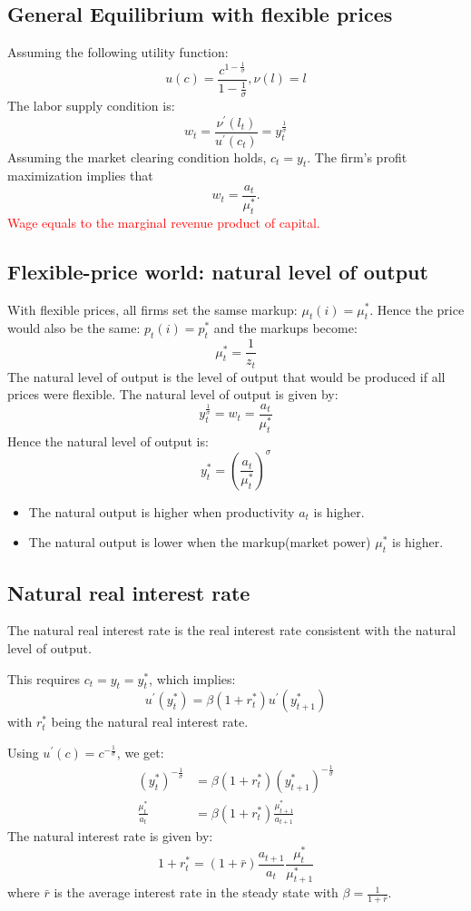 \subsection{General Equilibrium with flexible prices}

Assuming the following utility function:
\[
u(c) = \frac{c^{1-\frac{1}{\sigma}}}{1-\frac{1}{\sigma}}, \nu(l) = l
\]
The labor supply condition is:
\[
w_t = \frac{\nu^{\prime}(l_t)}{u^{\prime}(c_t)} = y_t^{\frac{1}{\sigma}}
\]
Assuming the market clearing condition holds, $c_t = y_t$.
The firm's profit maximization implies that 
\[
w_t = \frac{a_t}{\mu_t^*}.
\]
\textcolor{red}{Wage equals to the marginal revenue product of capital.}

\subsection{Flexible-price world: natural level of output}
With flexible prices, all firms set the samse markup: $\mu_t(i) = \mu_t^*$.
Hence the price would also be the same: $p_t(i) = p_t^*$ and the markups
become:
\[
\mu_t^* = \frac{1}{z_t}
\]
The natural level of output is the level of output that would be produced if all prices were flexible.
The natural level of output is given by:
\[
y_t^{\frac{1}{\sigma}} = w_t = \frac{a_t}{\mu_t^*}
\]
Hence the natural level of output is:
\[
y_t^* = \left( \frac{a_t}{\mu_t^*} \right)^{\sigma}
\]
\begin{itemize}
    \item The natural output is higher when productivity $a_t$ is higher.
    \item The natural output is lower when the markup(market power) $\mu_t^*$ is higher.
\end{itemize}

\subsection{Natural real interest rate}
The natural real interest rate is the real interest rate consistent with the natural level of output.

This requires $c_t = y_t = y_t^*$, which implies:
\[
u^{\prime} (y_t^*) = \beta (1+r_t^*)u^{\prime} (y_{t+1}^*)
\]
with $r_t^*$ being the natural real interest rate.

Using $u^{\prime}(c) = c^{-\frac{1}{\sigma}}$, we get:
\begin{align*}
    \left(y_t^{*}\right)^{-\frac{1}{\sigma}} &= \beta (1+r_t^*)\left(y_{t+1}^*\right)^{-\frac{1}{\sigma}}\\
    \frac{\mu_t^*}{a_t} &= \beta (1+r_t^*)\frac{\mu_{t+1}^*}{a_{t+1}}
\end{align*}
The natural interest rate is given by:
\[
1 + r_t^* = (1+\bar{r}) \frac{a_{t+1}}{a_t} \frac{\mu_t^*}{ \mu_{t+1}^*}
\]
where $\bar{r}$ is the average interest rate in the steady state with $\beta = \frac{1}{1+\overline{r}}$.

